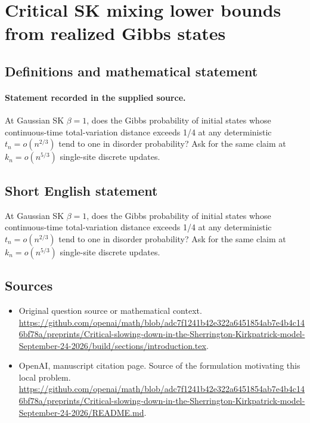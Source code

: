 \documentclass[11pt]{article}
\begin{document}
\section*{Critical SK mixing lower bounds from realized Gibbs states}\label{statement}
\subsection{Definitions and mathematical statement}
\paragraph{Statement recorded in the supplied source.}
At Gaussian SK $\beta =1$, does the Gibbs probability of initial states whose continuous-time total-variation distance exceeds 1/4 at any deterministic $t_n=o(n^{2/3})$ tend to one in disorder probability? Ask for the same claim at $k_n=o(n^{5/3})$ single-site discrete updates.
\subsection{Short English statement}
At Gaussian SK $\beta =1$, does the Gibbs probability of initial states whose continuous-time total-variation distance exceeds 1/4 at any deterministic $t_n=o(n^{2/3})$ tend to one in disorder probability? Ask for the same claim at $k_n=o(n^{5/3})$ single-site discrete updates.
\subsection{Sources}
\begin{itemize}
\item[S1] Original question source or mathematical context.
\url{https://github.com/openai/math/blob/adc7f1241b42e322a6451854ab7e4b4c146bf78a/preprints/Critical-slowing-down-in-the-Sherrington-Kirkpatrick-model-September-24-2026/build/sections/introduction.tex}.
\item[S2] OpenAI, manuscript citation page. Source of the formulation motivating this local problem.
\url{https://github.com/openai/math/blob/adc7f1241b42e322a6451854ab7e4b4c146bf78a/preprints/Critical-slowing-down-in-the-Sherrington-Kirkpatrick-model-September-24-2026/README.md}.
\end{itemize}
\end{document}
